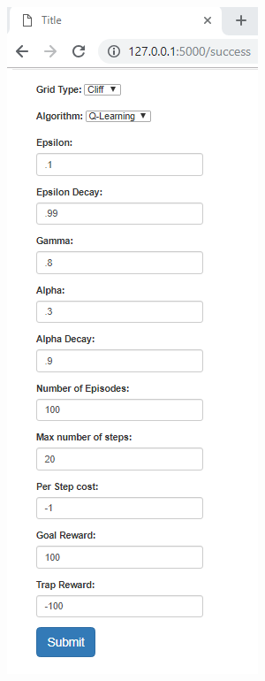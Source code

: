 \begin{enumerate}
\begin{figure}[H]
		\includegraphics[width=0.7\linewidth]{img/successForm}
		\caption{}
		\label{fig:successform}
	\end{figure}
		
\end{enumerate}



